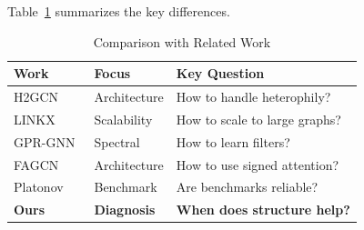 Table~\ref{tab:related_comparison} summarizes the key differences.

\begin{table}[t]
\centering
\caption{Comparison with Related Work}
\label{tab:related_comparison}
\begin{tabular}{@{}lll@{}}
\toprule
\textbf{Work} & \textbf{Focus} & \textbf{Key Question} \\
\midrule
H2GCN~\cite{zhu2020beyond} & Architecture & How to handle heterophily? \\
LINKX~\cite{lim2021large} & Scalability & How to scale to large graphs? \\
GPR-GNN~\cite{chien2021gprgnn} & Spectral & How to learn filters? \\
FAGCN~\cite{bo2021fagcn} & Architecture & How to use signed attention? \\
Platonov~\cite{platonov2023heterophilous} & Benchmark & Are benchmarks reliable? \\
\textbf{Ours} & \textbf{Diagnosis} & \textbf{When does structure help?} \\
\bottomrule
\end{tabular}
\end{table}
